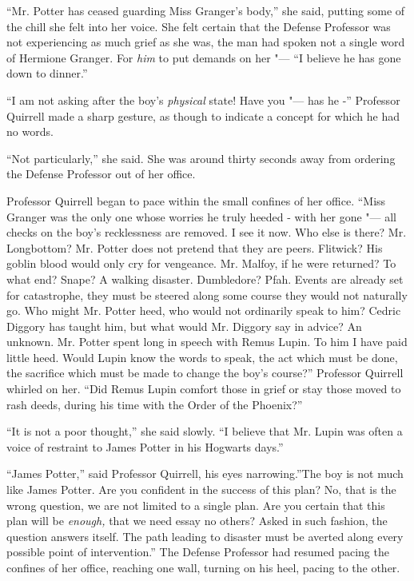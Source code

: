 ``Mr. Potter has ceased guarding Miss Granger's body,'' she said,
putting some of the chill she felt into her voice. She felt certain that
the Defense Professor was not experiencing as much grief as she was, the
man had spoken not a single word of Hermione Granger. For \emph{him} to
put demands on her "--- ``I believe he has gone down to dinner.''

``I am not asking after the boy's \emph{physical} state! Have you "--- has
he -'' Professor Quirrell made a sharp gesture, as though to indicate a
concept for which he had no words.

``Not particularly,'' she said. She was around thirty seconds away from
ordering the Defense Professor out of her office.

Professor Quirrell began to pace within the small confines of her
office. ``Miss Granger was the only one whose worries he truly heeded -
with her gone "--- all checks on the boy's recklessness are removed. I see
it now. Who else is there? Mr. Longbottom? Mr. Potter does not pretend
that they are peers. Flitwick? His goblin blood would only cry for
vengeance. Mr. Malfoy, if he were returned? To what end? Snape? A
walking disaster. Dumbledore? Pfah. Events are already set for
catastrophe, they must be steered along some course they would not
naturally go. Who might Mr. Potter heed, who would not ordinarily speak
to him? Cedric Diggory has taught him, but what would Mr. Diggory say in
advice? An unknown. Mr. Potter spent long in speech with Remus Lupin. To
him I have paid little heed. Would Lupin know the words to speak, the
act which must be done, the sacrifice which must be made to change the
boy's course?'' Professor Quirrell whirled on her. ``Did Remus Lupin
comfort those in grief or stay those moved to rash deeds, during his
time with the Order of the Phoenix?''

``It is not a poor thought,'' she said slowly. ``I believe that Mr.
Lupin was often a voice of restraint to James Potter in his Hogwarts
days.''

``James Potter,'' said Professor Quirrell, his eyes narrowing.''The boy
is not much like James Potter. Are you confident in the success of this
plan? No, that is the wrong question, we are not limited to a single
plan. Are you certain that this plan will be \emph{enough,} that we need
essay no others? Asked in such fashion, the question answers itself. The
path leading to disaster must be averted along every possible point of
intervention.'' The Defense Professor had resumed pacing the confines of
her office, reaching one wall, turning on his heel, pacing to the other.

